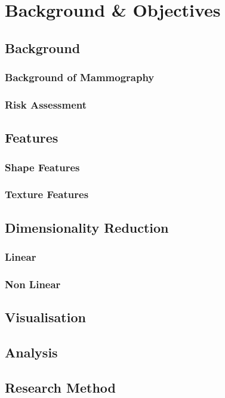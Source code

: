 \chapter{Background \& Objectives}

\section{Background}
\subsection{Background of Mammography}
\subsection{Risk Assessment}

\section{Features}
\subsection{Shape Features}
\subsection{Texture Features}

\section{Dimensionality Reduction}
\subsection{Linear}
\subsection{Non Linear}

\section{Visualisation}

\section{Analysis}

\section{Research Method}
